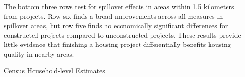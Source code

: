 \documentclass[12pt]{article}
\begin{document}
The bottom three rows test for spillover effects in areas within 1.5 kilometers from projects.  Row six finds a broad improvements across all measures in spillover areas, but row five finds no economically significant differences for constructed projects compared to unconstructed projects.  These results provide little evidence that finishing a housing project differentially benefits housing quality in nearby areas.

  \clearpage%
\begin{landscape}
{\footnotesize
\begin{table}
\caption{Census Household-level Estimates}\label{table:censusestimates}
\centering

\end{table}
}
\end{landscape}


% 


% 
\end{document}
